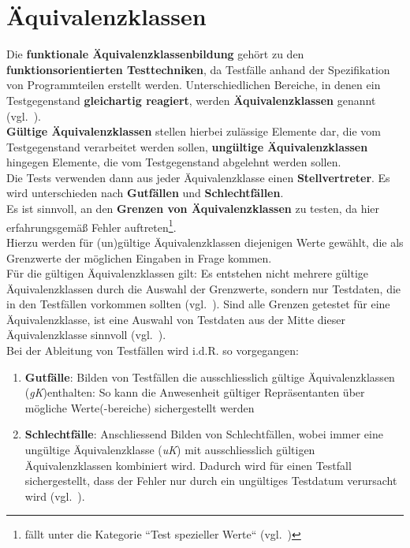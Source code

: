\section{Äquivalenzklassen}


\begin{tcolorbox}[title=Äquivalenzklassen]
    Die \textbf{funktionale Äquivalenzklassenbildung} gehört zu den \textbf{funktionsorientierten Testtechniken}, da Testfälle anhand der Spezifikation von Programmteilen erstellt werden. Unterschiedlichen Bereiche, in denen ein Testgegenstand \textbf{gleichartig reagiert}, werden \textbf{Äquivalenzklassen} genannt (vgl.~\cite[43]{Wed09c}).\\

    \noindent
    \textbf{Gültige Äquivalenzklassen} stellen hierbei zulässige Elemente dar, die vom Testgegenstand verarbeitet werden sollen, \textbf{ungültige Äquivalenzklassen} hingegen Elemente, die vom Testgegenstand abgelehnt werden sollen.\\

    \noindent
    Die Tests verwenden dann aus jeder Äquivalenzklasse einen \textbf{Stellvertreter}.
    Es wird unterschieden nach \textbf{Gutfällen} und \textbf{Schlechtfällen}.\\
    Es ist sinnvoll, an den \textbf{Grenzen von Äquivalenzklassen} zu testen, da hier erfahrungsgemäß Fehler auftreten\footnote{
    fällt unter die Kategorie ``Test spezieller Werte`` (vgl.~\cite[432]{Bal97})
    }.\\
    Hierzu werden für (un)gültige Äquivalenzklassen diejenigen Werte gewählt, die als Grenzwerte der möglichen Eingaben in Frage kommen.\\
    Für die gültigen Äquivalenzklassen gilt: Es entstehen nicht mehrere gültige Äquivalenzklassen durch die Auswahl der Grenzwerte, sondern nur Testdaten, die in den Testfällen vorkommen sollten (vgl.~\cite[Tabelle 2.2, Tabelle 2.3, 56 f.]{Lig09b}).
    Sind alle Grenzen getestet für eine Äquivalenzklasse, ist eine Auswahl von Testdaten aus der Mitte dieser Äquivalenzklasse sinnvoll (vgl.~\cite[431]{Bal97}).\\

    \noindent
    Bei der Ableitung von Testfällen wird i.d.R. so vorgegangen:
    \begin{enumerate}
        \item \textbf{Gutfälle}: Bilden von Testfällen die ausschliesslich gültige Äquivalenzklassen (\textit{gK})enthalten: So kann die Anwesenheit gültiger Repräsentanten über mögliche Werte(-bereiche) sichergestellt werden
        \item \textbf{Schlechtfälle}: Anschliessend Bilden von Schlechtfällen, wobei immer eine ungültige Äquivalenzklasse (\textit{uK}) mit ausschliesslich gültigen Äquivalenzklassen kombiniert wird.
        Dadurch wird für einen Testfall sichergestellt, dass der Fehler nur durch ein ungültiges Testdatum verursacht wird (vgl.~\cite[55 f.]{Lig09b}).
    \end{enumerate}


\end{tcolorbox}
